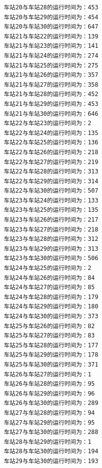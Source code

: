 \documentclass[UTF8]{ctexart}
\begin{document}
\begin{center}
\begin{lstlisting}
	车站20与车站28的运行时间为：453
	车站20与车站29的运行时间为：454
	车站20与车站30的运行时间为：647
	车站21与车站22的运行时间为：139
	车站21与车站23的运行时间为：141
	车站21与车站24的运行时间为：274
	车站21与车站25的运行时间为：275
	车站21与车站26的运行时间为：357
	车站21与车站27的运行时间为：358
	车站21与车站28的运行时间为：452
	车站21与车站29的运行时间为：453
	车站21与车站30的运行时间为：646
	车站22与车站23的运行时间为：2
	车站22与车站24的运行时间为：135
	车站22与车站25的运行时间为：136
	车站22与车站26的运行时间为：218
	车站22与车站27的运行时间为：219
	车站22与车站28的运行时间为：313
	车站22与车站29的运行时间为：314
	车站22与车站30的运行时间为：507
	车站23与车站24的运行时间为：133
	车站23与车站25的运行时间为：135
	车站23与车站26的运行时间为：217
	车站23与车站27的运行时间为：218
	车站23与车站28的运行时间为：312
	车站23与车站29的运行时间为：313
	车站23与车站30的运行时间为：506
	车站24与车站25的运行时间为：2
	车站24与车站26的运行时间为：84
	车站24与车站27的运行时间为：85
	车站24与车站28的运行时间为：179
	车站24与车站29的运行时间为：180
	车站24与车站30的运行时间为：373
	车站25与车站26的运行时间为：82
	车站25与车站27的运行时间为：83
	车站25与车站28的运行时间为：177
	车站25与车站29的运行时间为：178
	车站25与车站30的运行时间为：371
	车站26与车站27的运行时间为：1
	车站26与车站28的运行时间为：95
	车站26与车站29的运行时间为：96
	车站26与车站30的运行时间为：289
	车站27与车站28的运行时间为：94
	车站27与车站29的运行时间为：95
	车站27与车站30的运行时间为：288
	车站28与车站29的运行时间为：1
	车站28与车站30的运行时间为：194
	车站29与车站30的运行时间为：193
	\end{lstlisting}
\end{center}
\end{document}
